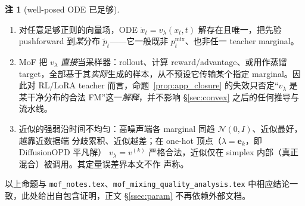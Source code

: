 \documentclass[11pt,a4paper]{article}
\newcommand{\N}{\mathcal{N}}
\theoremstyle{definition}
\newtheorem{remark}{注}
\begin{document}
\begin{remark}[well-posed ODE 已足够]
\label{rem:app_wellposed}
\leavevmode
\begin{enumerate}[leftmargin=1.5em]
\item 对任意足够正则的向量场，ODE $\dot x_t=v_\lambda(x_t,t)$ 解存在且唯一，把先验
pushforward 到\emph{某}分布 $\tilde p_t$——它一般既非 $p_t^{\mathrm{mix}}$、也非任一 teacher
marginal。
\item MoF 把 $v_\lambda$ \emph{直接}当采样器：rollout、计算 reward/advantage、或用作蒸馏
target，全部基于其\emph{实际}生成的样本，从不预设它传输某个指定 marginal。因此对 RL/LoRA
teacher 而言，命题~\ref{prop:app_closure} 的失效只否定``$v_\lambda$ 是某干净分布的合法
FM''这一\emph{解释}，并不影响 \S\ref{sec:convex} 之后的任何推导与流水线。
\item 近似的强弱沿时间不均匀：高噪声端各 marginal 同趋 $\N(0,I)$、近似最好，越靠近数据端
分歧累积、近似越差；在 one-hot 顶点（$\lambda=\bm e_k$，即 DiffusionOPD 平凡解）
$v_\lambda=v^{(k)}$ 严格合法，近似仅在 simplex 内部（真正混合）被调用。其定量误差界本文不作
声称。
\end{enumerate}
\end{remark}

\noindent 以上命题与 \texttt{mof\_notes.tex}、\texttt{mof\_mixing\_quality\_analysis.tex}
中相应结论一致，此处给出自包含证明，正文 \S\ref{ssec:param} 不再依赖外部文档。
\end{document}
